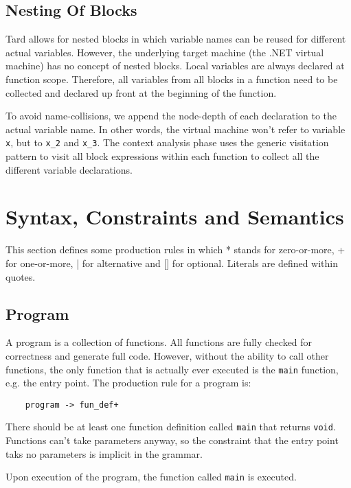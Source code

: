 \documentclass{report}
\begin{document}
\section{Nesting Of Blocks}

Tard allows for nested blocks in which variable names can be reused
for different actual variables. However, the underlying target
machine (the .NET virtual machine) has no concept of nested blocks.
Local variables are always declared at function scope. Therefore,
all variables from all blocks in a function need to be collected and
declared up front at the beginning of the function.

To avoid name-collisions, we append the node-depth of each
declaration to the actual variable name. In other words, the virtual
machine won't refer to variable \texttt{x}, but to \texttt{x\_2} and
\texttt{x\_3}. The context analysis phase uses the generic
visitation pattern to visit all block expressions within each
function to collect all the different variable declarations.

\chapter{Syntax, Constraints and Semantics}

This section defines some production rules in which * stands for
zero-or-more, + for one-or-more, | for alternative and [] for optional. Literals are defined
within quotes.

\section{Program}

A program is a collection of functions. All functions are fully
checked for correctness and generate full code. However, without the
ability to call other functions, the only function that is actually
ever executed is the \texttt{main} function, e.g. the entry point.
The production rule for a program is:

\begin{verbatim}
    program -> fun_def+
\end{verbatim}

There should be at least one function definition called
\texttt{main} that returns \texttt{void}. Functions can't take
parameters anyway, so the constraint that the entry point taks no
parameters is implicit in the grammar.

Upon execution of the program, the function called \texttt{main} is
executed.
\end{document}
